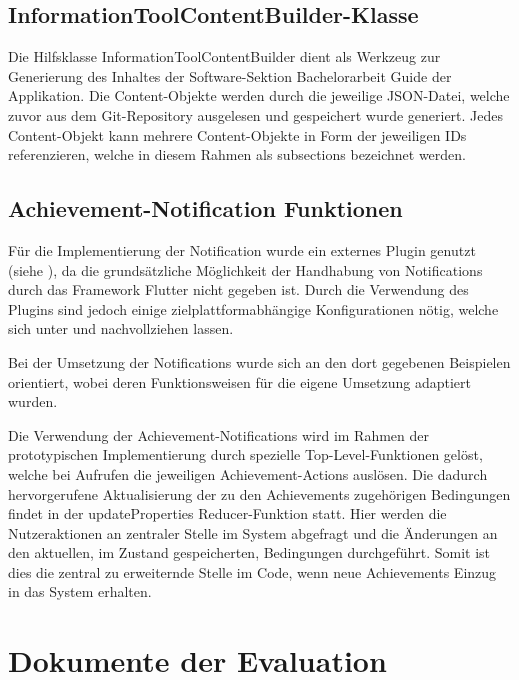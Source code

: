 \documentclass[bibliography=totoc,listof=totoc,BCOR=5mm,DIV=12,oneside]{scrbook}
\begin{document}
{\subsection{InformationToolContentBuilder-Klasse}
\par Die Hilfsklasse InformationToolContentBuilder dient als Werkzeug zur Generierung des Inhaltes der Software-Sektion \grqq Bachelorarbeit Guide\grqq{} der Applikation. Die Content-Objekte werden durch die jeweilige JSON-Datei, welche zuvor aus dem Git-Repository ausgelesen und gespeichert wurde generiert. Jedes Content-Objekt kann mehrere Content-Objekte in Form der jeweiligen IDs referenzieren, welche in diesem Rahmen als subsections bezeichnet werden.

\subsection{Achievement-Notification Funktionen}
\par Für die Implementierung der Notification wurde ein externes Plugin genutzt (siehe \citep{FlutterLocalNotificationPlugin}), da die grundsätzliche Möglichkeit der Handhabung von Notifications durch das Framework Flutter nicht gegeben ist. Durch die Verwendung des Plugins sind jedoch einige zielplattformabhängige Konfigurationen nötig, welche sich unter \citep[Android Integration]{FlutterLocalNotificationPlugin} und \citep[iOS Integration]{FlutterLocalNotificationPlugin} nachvollziehen lassen.
\par \medskip Bei der Umsetzung der Notifications wurde sich an den dort gegebenen Beispielen orientiert, wobei deren Funktionsweisen für die eigene Umsetzung adaptiert wurden.
\par Die Verwendung der Achievement-Notifications wird im Rahmen der prototypischen Implementierung durch spezielle Top-Level-Funktionen gelöst, welche bei Aufrufen die jeweiligen Achievement-Actions auslösen. Die dadurch hervorgerufene Aktualisierung der zu den Achievements zugehörigen Bedingungen findet in der updateProperties Reducer-Funktion statt. Hier werden die Nutzeraktionen an zentraler Stelle im System abgefragt und die Änderungen an den aktuellen, im Zustand gespeicherten, Bedingungen durchgeführt. Somit ist dies die zentral zu erweiternde Stelle im Code, wenn neue Achievements Einzug in das System erhalten.

\section{Dokumente der Evaluation}
\label{anhang:evaluation}

}
\end{document}
